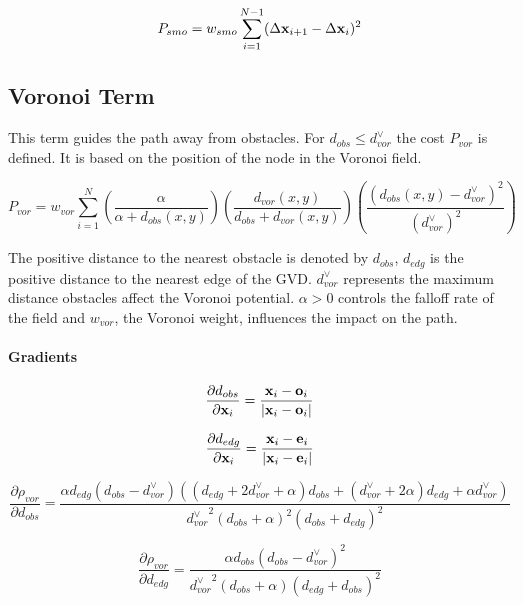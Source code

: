 \begin{equation}
P_{smo} = w_{smo} \displaystyle\sum_{i=1}^{N-1} (\Delta\mathbf{x}_{i+1} - \Delta\mathbf{x}_i)^2
\end{equation}

\subsection{Voronoi Term}
This term guides the path away from obstacles. For $d_{obs} \leq d_{vor}^{\lor}$ the cost $P_{vor}$ is defined. It is based on the position of the node in the Voronoi field.

\begin{equation}
P_{vor} = w_{vor} \displaystyle\sum_{i=1}^{N} \left(\frac{\alpha}{\alpha + d_{obs}(x,y)}\right)\left(\frac{d_{vor}(x,y)}{d_{obs} + d_{vor}(x,y)}\right)\left(\frac{(d_{obs}(x,y) - d_{vor}^{\lor})^2}{(d_{vor}^{\lor})^2}\right)
\end{equation}

The positive distance to the nearest obstacle is denoted by $d_{obs}$, $d_{edg}$ is the positive distance to the nearest edge of the GVD. $d_{vor}^{\lor}$ represents the maximum distance obstacles affect the Voronoi potential. $\alpha > 0$ controls the falloff rate of the field and $w_{vor}$, the Voronoi weight, influences the impact on the path.

\paragraph{Gradients}

\begin{equation}
\frac{\partial d_{obs}}{\partial \mathbf{x}_i} = \frac{\mathbf{x}_i-\mathbf{o}_i}{|\mathbf{x}_i-\mathbf{o}_i|}
\end{equation}

\begin{equation}
\frac{\partial d_{edg}}{\partial \mathbf{x}_i} =\frac{\mathbf{x}_i-\mathbf{e}_i}{|\mathbf{x}_i-\mathbf{e}_i|}
\end{equation}

\begin{equation}
\frac{\partial\rho_{vor}}{\partial d_{obs}} = \frac{\alpha d_{edg}\left(d_{obs}-d_{vor}^{\lor}\right)\left(\left(d_{edg}+2d_{vor}^{\lor}+\alpha\right) d_{obs}+\left(d_{vor}^{\lor}+2\alpha\right)d_{edg}+\alpha d_{vor}^{\lor}\right)}{{d_{vor}^{\lor}}^2\left(d_{obs}+\alpha\right)^2\left(d_{obs}+d_{edg}\right)^2}
\end{equation}

\begin{equation}
\frac{\partial\rho_{vor}}{\partial d_{edg}} =  \frac{\alpha d_{obs}\left(d_{obs}-d_{vor}^{\lor}\right)^2}{{d_{vor}^{\lor}}^2\left(d_{obs}+\alpha\right)\left(d_{edg}+d_{obs}\right)^2}
\end{equation}

